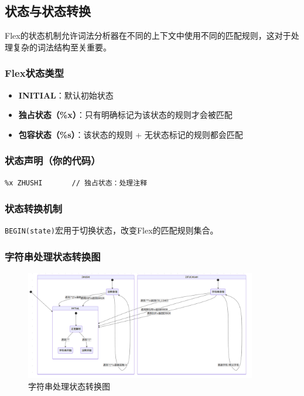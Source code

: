 \documentclass[twocolumn]{article}
\begin{document}
\subsection{状态与状态转换}

Flex的状态机制允许词法分析器在不同的上下文中使用不同的匹配规则，这对于处理复杂的词法结构至关重要。

\subsubsection{Flex状态类型}
\begin{itemize}
    \item \textbf{INITIAL}：默认初始状态
    \item \textbf{独占状态（\%x）}：只有明确标记为该状态的规则才会被匹配
    \item \textbf{包容状态（\%s）}：该状态的规则 + 无状态标记的规则都会匹配
\end{itemize}

\subsubsection{状态声明（你的代码）}
\begin{lstlisting}[language=Flex, caption={状态声明}]
%x ZIFUCHUAN    // 独占状态：处理字符串
%x ZHUSHI       // 独占状态：处理注释
\end{lstlisting}

\subsubsection{状态转换机制}
\texttt{BEGIN(state)}宏用于切换状态，改变Flex的匹配规则集合。

\subsubsection{字符串处理状态转换图}
\begin{figure}[H]
    \centering
    \includegraphics[width=0.9\textwidth]{status_change.png}
    \caption{字符串处理状态转换图}
    \label{fig:status_change}
\end{figure}
\end{document}
